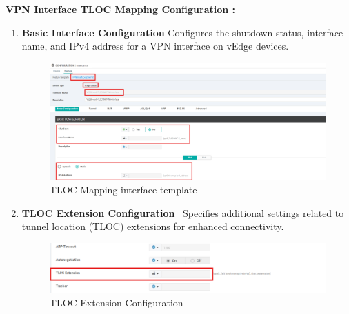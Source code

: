 \documentclass[12pt,english]{report}
\begin{document}
\textbf{VPN Interface TLOC Mapping Configuration :}
\begin{enumerate}
\item \textbf{Basic Interface Configuration}
Configures the shutdown status, interface name, and IPv4 address for a VPN interface on vEdge devices.
\begin{figure}[H]
    \centering
    \includegraphics[width= 1 \textwidth]{chapitre 3/template/7.png}
    \caption{TLOC Mapping interface template}
    \label{TLOC Mapping interface template}
\end{figure}
\item \textbf{TLOC Extension Configuration} \
Specifies additional settings related to tunnel location (TLOC) extensions for enhanced connectivity.
\begin{figure}[H]
    \centering
    \includegraphics[width= 1.1 \textwidth]{chapitre 3/template/7.5.png}
    \caption{TLOC Extension Configuration}
    \label{TLOC Extension Configuration}
\end{figure}
\end{enumerate}
\end{document}
